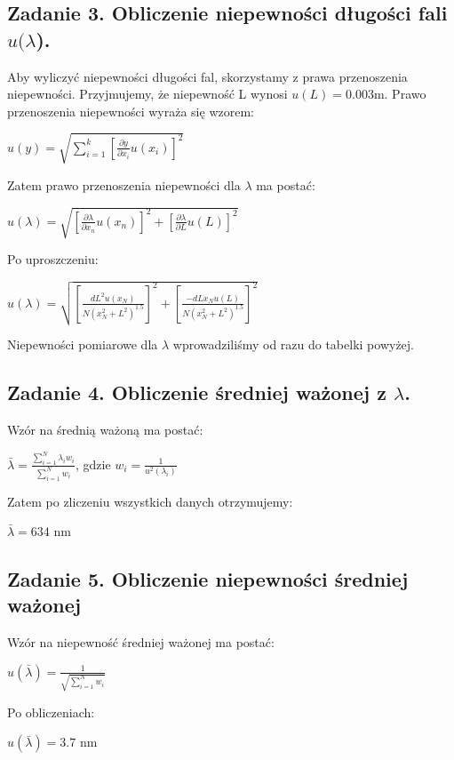 \documentclass[12pt]{article}
\begin{document}
\subsection*{Zadanie 3. Obliczenie niepewności długości fali $u(\lambda$).}
Aby wyliczyć niepewności długości fal, skorzystamy z prawa przenoszenia
niepewności. Przyjmujemy, że niepewność L wynosi $u(L) = 0.003$m. Prawo
przenoszenia niepewności wyraża się wzorem:

\begin{center}
    $u(y)=\sqrt{\sum_{i=1}^{k}[\frac{\partial y}{\partial x_i}u(x_i)]^2}$
\end{center}
Zatem prawo przenoszenia niepewności dla $\lambda$ ma postać:
\begin{center}

    $u(\lambda) = \sqrt{[\frac{\partial \lambda}{\partial x_n}u(x_n)]^2 +
        [\frac{\partial \lambda}{\partial L}u(L)]^2}$
\end{center}
Po uproszczeniu:
\begin{center}
    $u(\lambda) = \sqrt{[\frac{dL^2u(x_N)}{N(x_N^2+L^2)^{1.5}}]^2  +
        [\frac{-dLx_Nu(L)}{N(x_N^2+L^2)^{1.5}}]^2}$
\end{center}
Niepewności pomiarowe dla $\lambda$ wprowadziliśmy od razu do tabelki powyżej.

\subsection*{Zadanie 4. Obliczenie średniej ważonej z $\lambda$.}
Wzór na średnią ważoną ma postać:
\begin{center}
    $\bar{\lambda} = \frac{\sum_{i=1}^{N}\lambda_iw_i}{\sum_{i=1}^{N}w_i}$,
    gdzie $w_i = \frac{1}{u^2(\lambda_i)}$
\end{center}
Zatem po zliczeniu wszystkich danych otrzymujemy:
\begin{center}
    $\bar{\lambda} = 634$ nm
\end{center}

\subsection*{Zadanie 5. Obliczenie niepewności średniej ważonej}
Wzór na niepewność średniej ważonej ma postać:
\begin{center}
    $u(\bar{\lambda}) = \frac{1}{\sqrt{\sum_{i=1}^{N}w_i}}$
\end{center}
Po obliczeniach:
\begin{center}
    $u(\bar{\lambda}) = 3.7$ nm
\end{center}
\end{document}
